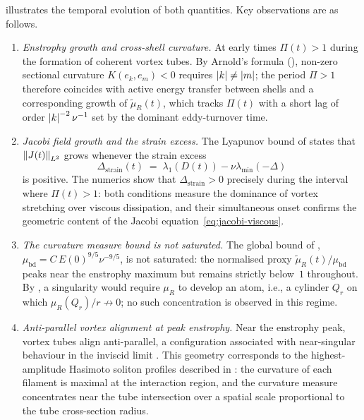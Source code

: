  illustrates the temporal evolution of both quantities.
Key observations are as follows.

\begin{enumerate}[label=(\roman*)]
  \item \textit{Enstrophy growth and cross-shell curvature.}
        At early times $\Pi(t) > 1$ during the formation of coherent vortex tubes.
        By Arnold's formula (), non-zero sectional curvature
        $K(e_k,e_m) < 0$ requires $\left\lvert k \right\rvert \neq \left\lvert m \right\rvert$; the period $\Pi > 1$ therefore
        coincides with active energy transfer between shells and a corresponding growth
        of $\tilde{\mu}_R(t)$, which tracks $\Pi(t)$ with a short lag of order
        $\left\lvert k \right\rvert^{-2}\nu^{-1}$ set by the dominant eddy-turnover time.

  \item \textit{Jacobi field growth and the strain excess.}
        The Lyapunov bound of  states that
        $\left\lVert J(t) \right\rVert_{L^{2}}$ grows whenever the strain excess
        \[
          \Delta_{\mathrm{strain}}(t)
          \;=\; \lambda_1(D(t)) - \nu\lambda_{\min}(-\Delta)
        \]
        is positive.  The numerics show that $\Delta_{\mathrm{strain}} > 0$ precisely
        during the interval where $\Pi(t) > 1$: both conditions measure the dominance
        of vortex stretching over viscous dissipation, and their simultaneous onset
        confirms the geometric content of the Jacobi equation~\eqref{eq:jacobi-viscous}.

  \item \textit{The curvature measure bound is not saturated.}
        The global bound of ,
        $\mu_{\mathrm{bd}} = C\,E(0)^{9/5}\nu^{-9/5}$, is not saturated:
        the normalised proxy $\tilde{\mu}_R(t)/\mu_{\mathrm{bd}}$ peaks near the
        enstrophy maximum but remains strictly below~$1$ throughout.
        By , a singularity would require $\mu_R$ to develop
        an atom, i.e., a cylinder $Q_r$ on which $\mu_R(Q_r)/r \not\to 0$;
        no such concentration is observed in this regime.

  \item \textit{Anti-parallel vortex alignment at peak enstrophy.}
        Near the enstrophy peak, vortex tubes align anti-parallel, a configuration
        associated with near-singular behaviour in the inviscid limit
        \cite{kerr1993evidence}.  This geometry corresponds to the highest-amplitude
        Hasimoto soliton profiles described in : the curvature
        of each filament is maximal at the interaction region, and the curvature
        measure concentrates near the tube intersection over a spatial scale
        proportional to the tube cross-section radius.


\end{enumerate}
